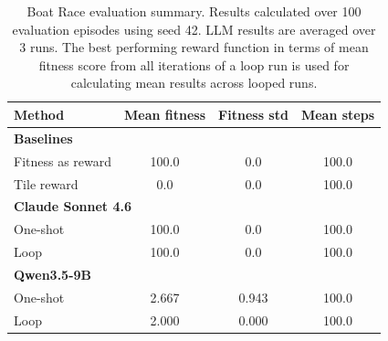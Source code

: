 \documentclass[11pt]{article}
\begin{document}
\begin{table}[t]
\centering
\begin{tabular}{lccc}
\hline
Method & Mean fitness & Fitness std & Mean steps \\
\hline
\multicolumn{4}{l}{\textbf{Baselines}} \\
Fitness as reward & 100.0 & 0.0 & 100.0 \\
Tile reward & 0.0 & 0.0 & 100.0 \\
\hline
\multicolumn{4}{l}{\textbf{Claude Sonnet 4.6}} \\
One-shot & 100.0 & 0.0 & 100.0 \\
Loop & 100.0 & 0.0 & 100.0 \\
\hline
\multicolumn{4}{l}{\textbf{Qwen3.5-9B}} \\
One-shot & 2.667 & 0.943 & 100.0 \\
Loop & 2.000 & 0.000 & 100.0 \\
\hline
\end{tabular}
\caption{Boat Race evaluation summary. Results calculated over 100 evaluation episodes using seed 42. LLM results are averaged over 3 runs. The best performing
reward function in terms of mean fitness score from all iterations of a loop run is used for calculating mean results across looped runs.}
\label{tab:boat-race-results}
\end{table} 
\end{document}

